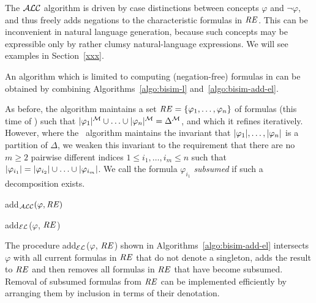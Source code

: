 The $\mathcal{ALC}$ algorithm is driven by case distinctions between
concepts $\varphi$ and $\neg \varphi$, and thus freely adds 
negations to the characteristic formulas in $\mathit{RE}$.  This can be inconvenient
in natural language generation, because such concepts may be expressible only by rather clumsy natural-language expressions. We will see examples in Section~\ref{xxx}.

An algorithm which is limited to computing
(negation-free) formulas in \el can be obtained by combining
Algorithms~\ref{algo:bisim-l} and~\ref{algo:bisim-add-el}.

As before, the algorithm maintains a set $\mathit{RE} = \{\varphi_1,\ldots,\varphi_n\}$ of
formulas (this time of \el) such that $|\varphi_1|^{\mathcal{M}} \cup \ldots \cup
|\varphi_n|^{\mathcal{M}} = \Delta^{\mathcal{M}}$, and which it refines iteratively.  However,
where the \alc\ algorithm maintains the invariant that
$|\varphi_1|,\ldots,|\varphi_n|$ is a partition of $\Delta$, we
weaken this invariant to the requirement that there are no $m \geq 2$
pairwise different indices $1 \leq i_1,\ldots,i_m \leq n$ such that
$|\varphi_{i_1}| = |\varphi_{i_2}| \cup \ldots \cup
|\varphi_{i_m}|$.  We call the formula $\varphi_{i_1}$ \emph{subsumed} if
such a decomposition exists.

\begin{algorithm}[t]
\caption{add$_\mathcal{ALC}(\varphi,\mathit{RE})$}
\label{algo:bisim-add-alc}
\end{algorithm}
%
\begin{algorithm}[t]
\dontprintsemicolon
\caption{add$_\mathcal{EL}$($\varphi$, $\mathit{RE}$)}
\label{algo:bisim-add-el}
\end{algorithm}

The procedure add$_\mathcal{EL}$($\varphi$, $\mathit{RE}$) shown in Algorithms~\ref{algo:bisim-add-el} intersects $\varphi$ with all current formulas in $\mathit{RE}$
that do not denote a singleton, adds the result to $\mathit{RE}$ and then
removes all formulas in $\mathit{RE}$ that have become subsumed.  Removal of
subsumed formulas from $\mathit{RE}$ can be implemented efficiently by arranging
them by inclusion in terms of their denotation.

